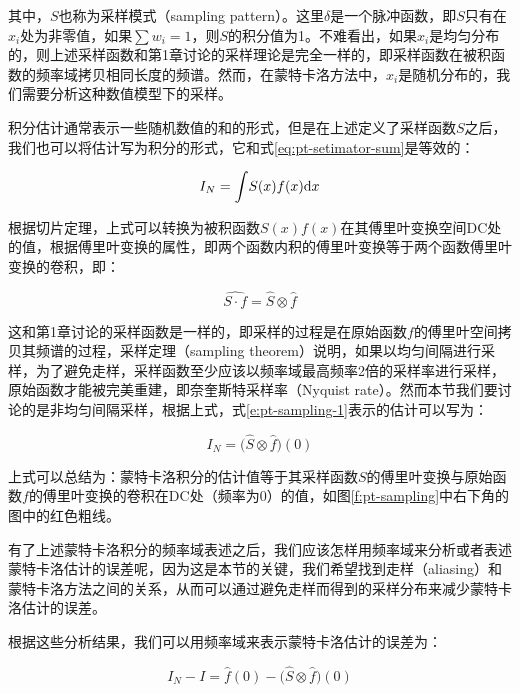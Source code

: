 \noindent 其中，$S$也称为采样模式（sampling pattern）。这里$\delta$是一个脉冲函数，即$S$只有在$x_i$处为非零值，如果$\sum w_i=1$，则$S$的积分值为1。不难看出，如果$x_i$是均匀分布的，则上述采样函数和第1章讨论的采样理论是完全一样的，即采样函数在被积函数的频率域拷贝相同长度的频谱。然而，在蒙特卡洛方法中，$x_i$是随机分布的，我们需要分析这种数值模型下的采样。

积分估计通常表示一些随机数值的和的形式，但是在上述定义了采样函数$S$之后，我们也可以将估计写为积分的形式，它和式\ref{eq:pt-setimator-sum}是等效的：

\begin{equation}\label{e:pt-sampling-1}
	I_N={\rm \int} S(x)f(x){\rm d}x
\end{equation}

\noindent 根据切片定理，上式可以转换为被积函数$S(x)f(x)$在其傅里叶变换空间DC处的值，根据傅里叶变换的属性，即两个函数内积的傅里叶变换等于两个函数傅里叶变换的卷积，即：

\begin{equation}
	\widehat{S\cdot f}=\hat{S}\otimes\hat{f}
\end{equation}

\noindent 这和第1章讨论的采样函数是一样的，即采样的过程是在原始函数$f$的傅里叶空间拷贝其频谱的过程，采样定理（sampling theorem）说明，如果以均匀间隔进行采样，为了避免走样，采样函数至少应该以频率域最高频率2倍的采样率进行采样，原始函数才能被完美重建，即奈奎斯特采样率（Nyquist rate）。然而本节我们要讨论的是非均匀间隔采样，根据上式，式\ref{e:pt-sampling-1}表示的估计可以写为：

\begin{equation}
	I_N=\bigg(\hat{S}\otimes\hat{f}\bigg)(0)
\end{equation}

\noindent 上式可以总结为：蒙特卡洛积分的估计值等于其采样函数$S$的傅里叶变换与原始函数$f$的傅里叶变换的卷积在DC处（频率为0）的值，如图\ref{f:pt-sampling}中右下角的图中的红色粗线。

有了上述蒙特卡洛积分的频率域表述之后，我们应该怎样用频率域来分析或者表述蒙特卡洛估计的误差呢，因为这是本节的关键，我们希望找到走样（aliasing）和蒙特卡洛方法之间的关系，从而可以通过避免走样而得到的采样分布来减少蒙特卡洛估计的误差。

根据这些分析结果，我们可以用频率域来表示蒙特卡洛估计的误差为：

\begin{equation}\label{e:pt-mc-aliasing}
	I_N-I=\hat{f}(0)-\bigg(\hat{S}\otimes\hat{f}\bigg)(0)
\end{equation}

